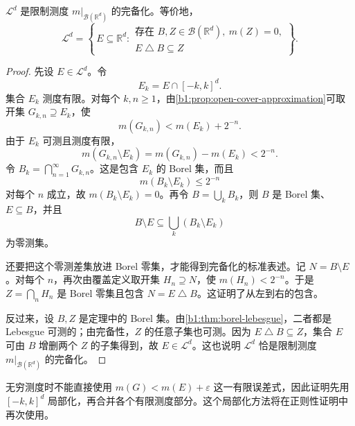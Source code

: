 \begin{theorem}
\label{b1:thm:lebesgue-completion-borel}
\(\mathcal L^d\) 是限制测度 \(m|_{\mathcal B(\mathbb R^d)}\) 的完备化。等价地，
\[
\mathcal L^d
=\left\{\,E\subseteq\mathbb R^d:
\begin{array}{l}
\text{存在 }B,Z\in\mathcal B(\mathbb R^d),\ m(Z)=0,\\
E\mathbin{\triangle}B\subseteq Z
\end{array}
\right\}.
\]
\end{theorem}
\begin{proof}
先设 \(E\in\mathcal L^d\)。令
\[
E_k=E\cap[-k,k]^d.
\]
集合 \(E_k\) 测度有限。对每个 \(k,n\geq1\)，由\cref{b1:prop:open-cover-approximation}可取开集 \(G_{k,n}\supseteq E_k\)，使
\[
m(G_{k,n})<m(E_k)+2^{-n}.
\]
由于 \(E_k\) 可测且测度有限，
\[
m(G_{k,n}\setminus E_k)
=m(G_{k,n})-m(E_k)<2^{-n}.
\]
令 \(B_k=\bigcap_{n=1}^{\infty}G_{k,n}\)。这是包含 \(E_k\) 的 Borel 集，而且
\[
m(B_k\setminus E_k)\leq 2^{-n}
\]
对每个 \(n\) 成立，故 \(m(B_k\setminus E_k)=0\)。再令 \(B=\bigcup_kB_k\)，则 \(B\) 是 Borel 集、\(E\subseteq B\)，并且
\[
B\setminus E\subseteq\bigcup_k(B_k\setminus E_k)
\]
为零测集。

还要把这个零测差集放进 Borel 零集，才能得到完备化的标准表述。记 \(N=B\setminus E\)。对每个 \(n\)，再次由覆盖定义取开集 \(H_n\supseteq N\)，使 \(m(H_n)<2^{-n}\)。于是
\(Z=\bigcap_nH_n\) 是 Borel 零集且包含 \(N=E\mathbin{\triangle}B\)。这证明了从左到右的包含。

反过来，设 \(B,Z\) 是定理中的 Borel 集。由\cref{b1:thm:borel-lebesgue}，二者都是 Lebesgue 可测的；由完备性，\(Z\) 的任意子集也可测。因为 \(E\mathbin{\triangle}B\subseteq Z\)，集合 \(E\) 可由 \(B\) 增删两个 \(Z\) 的子集得到，故 \(E\in\mathcal L^d\)。这也说明 \(\mathcal L^d\) 恰是限制测度 \(m|_{\mathcal B(\mathbb R^d)}\) 的完备化。
\end{proof}

无穷测度时不能直接使用
\(m(G)<m(E)+\varepsilon\) 这一有限误差式，因此证明先用 \([-k,k]^d\) 局部化，再合并各个有限测度部分。这个局部化方法将在正则性证明中再次使用。
